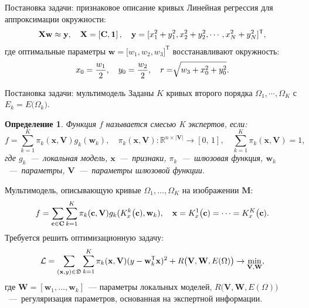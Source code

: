 \documentclass[10pt,pdf,hyperref={unicode}]{beamer}
\newtheorem{rusdefinition}{Определение}
\begin{document}
\begin{frame}{Постановка задачи: признаковое описание кривых}
Линейная регрессия для аппроксимации окружности:
\[
\setlength\abovedisplayskip{0pt}
\begin{aligned}
\textbf{X}\textbf{w} \approx \textbf{y},  \quad \textbf{X} = \left[\textbf{C}, \textbf{1}\right], \quad \textbf{y} = [x_1^2+y_1^2, x_2^2+y_2^2, \cdots, x_N^2+y_N^2]^{\mathsf{T}},
\end{aligned}
\setlength\belowdisplayskip{0pt}
\]
где оптимальные параметры $\textbf{w} = \bigr[w_1, w_2, w_3\bigr]^{\mathsf{T}}$ восстанавливают окружность:
\[
\setlength\abovedisplayskip{0pt}
\begin{aligned}
x_0 = \frac{w_1}{2}, \quad y_0 = \frac{w_2}{2}, \quad r = \sqrt[]{w_3+x_{0}^{2}+y_{0}^{2}}.
\end{aligned}
\setlength\belowdisplayskip{0pt}
\]


\end{frame}


\begin{frame}{Постановка задачи: мультимодель}
\justifying
Заданы $K$ кривых второго порядка $\Omega_1, \cdots, \Omega_K$ с $E_k = E\bigr(\Omega_k\bigr)$.

\begin{rusdefinition}
Функция $f$ называется смесью K экспертов, если:
\[
	f = \sum\limits_{k = 1}^{K}\pi_k(\mathbf{x}, \mathbf{V})g_k(\mathbf{w}_k),  \quad \pi_k(\mathbf{x}, \mathbf{V}): \mathbb{R}^{n\times |\mathbf{V}|} \rightarrow [0, \, 1], \quad \sum\limits_{k = 1}^{K}\pi_k(\mathbf{x}, \mathbf{V}) = 1, 
\]
где $g_k$~---~локальная модель, $\mathbf{x}$~---~признаки, $\pi_k$~---~шлюзовая функция, $\mathbf{w}_k$~---~параметры, $\mathbf{V}$~---~параметры шлюзовой функции.
\end{rusdefinition}

Мультимодель, описывающую кривые $\Omega_1, \dots, \Omega_K$ на изображении $\mathbf{M}$:
\[
\setlength\abovedisplayskip{0pt}
	f = \sum\limits_{\mathbf{c} \in \mathbf{C}} \sum_{k = 1}^{K} \pi_k(\mathbf{c}, \mathbf{V})g_k(K^k_{x}\bigl(\mathbf{c}), \mathbf{w}_k), \quad \mathbf{x}=K^1_{x}\bigl(\mathbf{c})=\cdots=K^K_{x}\bigl(\mathbf{c}).
\setlength\belowdisplayskip{0pt}
\]
Требуется решить оптимизационную задачу:
\[
\setlength\abovedisplayskip{0pt}
\mathcal{L} = \sum\limits_{(\mathbf{x}, y) \in \mathfrak{D}} \sum\limits_{k = 1}^{K} \pi_k(\mathbf{x}, \mathbf{V})(y - \mathbf{w}_k^{\mathsf{T}}\mathbf{x})^2 + R\bigl(\mathbf{V}, \mathbf{W}, E(\Omega)\bigr) \rightarrow \min_{\mathbf{V}, \mathbf{W}},
\setlength\belowdisplayskip{0pt}
\]
где $\mathbf{W} = [\mathbf{w}_1, \dots, \mathbf{w}_k]$~--- параметры локальных моделей, $R\bigl(\mathbf{V}, \mathbf{W}, E(\Omega)\bigr)$~---~регуляризация параметров, основанная на экспертной информации.

\end{frame}
\end{document}
